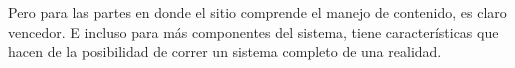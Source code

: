 Pero para las partes en donde el sitio \ecommerce comprende el manejo de contenido, \mongodbNAME es claro vencedor. E incluso para más componentes \transactionalDB del sistema, \mongodbNAME tiene características que hacen de la posibilidad de correr un sistema completo de \ecommerce una realidad.


\section{\nodejsNAME}\label{cap:section:nodejs}





